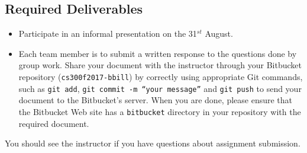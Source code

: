 
\vspace*{-.2in}
\color{red}
\subsection*{Required Deliverables}
\vspace*{-.1in}
\begin{itemize}
	\item Participate in an informal presentation on the 31$^{st}$ August.
	\item Each team member is to submit a written response to the questions done by group work. Share your document with the instructor through your Bitbucket repository ({\tt cs300f2017-bbill}) by correctly using  appropriate Git commands, such as {\tt git add}, {\tt git commit -m ``your message''} and {\tt git push} to send your document to the Bitbucket's server. When you are done, please ensure that the Bitbucket Web site has
a {\tt bitbucket} directory in your repository with the required document.  
\end{itemize}
\color{black}

\noindent You should see the instructor if you have questions about assignment submission.


